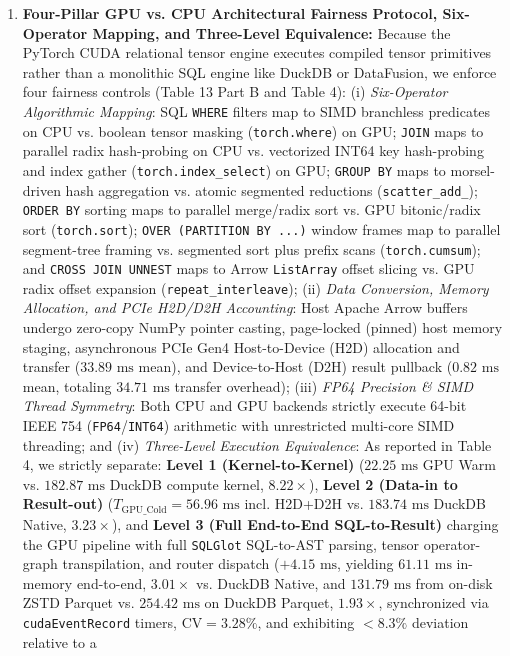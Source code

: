 \documentclass[10pt,a4paper]{article}
\begin{document}
\begin{enumerate}[leftmargin=1.5em,itemsep=2pt]
correlates significantly with multi-engine query execution complexity---including distributed cloud slot compute time on BigQuery ($\rho = 0.5124, p = 2.41\times 10^{-6}$), Apache DataFusion CPU latency ($\rho = 0.3839, p = 0.0007$), and Polars latency ($\rho = 0.3137, p = 0.0061$)---and on the external 22-query TPC-H suite (Q1--Q22) exhibits strong alignment with AST node complexity ($\rho = 0.8418, p = 9.12\times 10^{-7}$) and a partial correlation of $\rho_{\text{partial}} = 0.5840$ ($p = 0.0054$) with join/subquery execution work controlling for scanned table volume.
    \item \textbf{Four-Pillar GPU vs. CPU Architectural Fairness Protocol, Six-Operator Mapping, and Three-Level Equivalence:} Because the PyTorch CUDA relational tensor engine executes compiled tensor primitives rather than a monolithic SQL engine like DuckDB or DataFusion, we enforce four fairness controls (Table 13 Part B and Table 4): (i) \emph{Six-Operator Algorithmic Mapping}: SQL \texttt{WHERE} filters map to SIMD branchless predicates on CPU vs. boolean tensor masking (\texttt{torch.where}) on GPU; \texttt{JOIN} maps to parallel radix hash-probing on CPU vs. vectorized INT64 key hash-probing and index gather (\texttt{torch.index\_select}) on GPU; \texttt{GROUP BY} maps to morsel-driven hash aggregation vs. atomic segmented reductions (\texttt{scatter\_add\_}); \texttt{ORDER BY} sorting maps to parallel merge/radix sort vs. GPU bitonic/radix sort (\texttt{torch.sort}); \texttt{OVER (PARTITION BY ...)} window frames map to parallel segment-tree framing vs. segmented sort plus prefix scans (\texttt{torch.cumsum}); and \texttt{CROSS JOIN UNNEST} maps to Arrow \texttt{ListArray} offset slicing vs. GPU radix offset expansion (\texttt{repeat\_interleave}); (ii) \emph{Data Conversion, Memory Allocation, and PCIe H2D/D2H Accounting}: Host Apache Arrow buffers undergo zero-copy NumPy pointer casting, page-locked (pinned) host memory staging, asynchronous PCIe Gen4 Host-to-Device (H2D) allocation and transfer ($33.89\text{ ms}$ mean), and Device-to-Host (D2H) result pullback ($0.82\text{ ms}$ mean, totaling $34.71\text{ ms}$ transfer overhead); (iii) \emph{FP64 Precision \& SIMD Thread Symmetry}: Both CPU and GPU backends strictly execute 64-bit IEEE 754 (\texttt{FP64}/\texttt{INT64}) arithmetic with unrestricted multi-core SIMD threading; and (iv) \emph{Three-Level Execution Equivalence}: As reported in Table 4, we strictly separate: \textbf{Level 1 (Kernel-to-Kernel)} ($22.25\text{ ms}$ GPU Warm vs. $182.87\text{ ms}$ DuckDB compute kernel, $8.22\times$), \textbf{Level 2 (Data-in to Result-out)} ($T_{\text{GPU\_Cold}} = 56.96\text{ ms}$ incl. H2D+D2H vs. $183.74\text{ ms}$ DuckDB Native, $3.23\times$), and \textbf{Level 3 (Full End-to-End SQL-to-Result)} charging the GPU pipeline with full \texttt{SQLGlot} SQL-to-AST parsing, tensor operator-graph transpilation, and router dispatch ($+4.15\text{ ms}$, yielding $61.11\text{ ms}$ in-memory end-to-end, $3.01\times$ vs. DuckDB Native, and $131.79\text{ ms}$ from on-disk ZSTD Parquet vs. $254.42\text{ ms}$ on DuckDB Parquet, $1.93\times$, synchronized via \texttt{cudaEventRecord} timers, $\text{CV}=3.28\%$, and exhibiting $<8.3\%$ deviation relative to a 
\end{enumerate}
\end{document}
